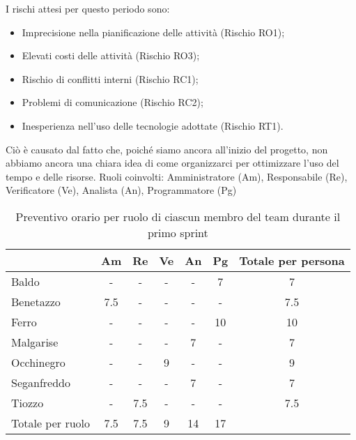         I rischi attesi per questo periodo sono:
        \begin{itemize}
            \item Imprecisione nella pianificazione delle attività (Rischio RO1);
            \item Elevati costi delle attività (Rischio RO3);
            \item Rischio di conflitti interni (Rischio RC1);
            \item Problemi di comunicazione (Rischio RC2);
            \item Inesperienza nell'uso delle tecnologie adottate (Rischio RT1).
        \end{itemize}
        Ciò è causato dal fatto che, poiché siamo ancora all'inizio del progetto, non abbiamo ancora una chiara idea di come organizzarci per ottimizzare l'uso del tempo e delle risorse.
        \newpage
        Ruoli coinvolti: Amministratore (Am), Responsabile (Re), Verificatore (Ve), Analista (An), Programmatore (Pg)
        \begin{table}[!h]
            \centering
            \begin{tabular}{ |l| c | c | c | c | c | c | } 
                \hline
                \textbf{} & \textbf{Am} & \textbf{Re} & \textbf{Ve} &\textbf{An} & \textbf{Pg} & \textbf{Totale per persona} \\
                \hline 
                Baldo       & - & -   & - & - & 7     & 7       \\ 
                Benetazzo   &  7.5    & - & - & - & - & 7.5     \\ 
                Ferro       & - & -   & - & - & 10     & 10       \\ 
                Malgarise   & - & -   & - & 7 & -     & 7       \\ 
                Occhinegro  & - & -   & 9 & - & -     & 9       \\ 
                Seganfreddo & - & -   & - & 7 & -     & 7       \\
                Tiozzo      & - & 7.5 & - & - & -     & 7.5     \\ 
                \hline
                Totale per ruolo & 7.5 & 7.5 & 9 & 14 & 17 &    \\
                \hline
            \end{tabular}
            \caption{Preventivo orario per ruolo di ciascun membro del team durante il primo sprint}
            \label{tab:1}
        \end{table}

